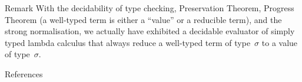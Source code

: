 \begin{frame}{Remark}
With the decidability of type checking, Preservation Theorem, Progress Theorem
(a well-typed term is either a ``value'' or a reducible term), and the strong
normalisation, we actually have exhibited a decidable evaluator of simply typed
lambda calculus that always reduce a well-typed term of type~$\sigma$ to a value
of type~$\sigma$.
\end{frame}

\begin{frame}[allowframebreaks]{References}


 

\end{frame}


